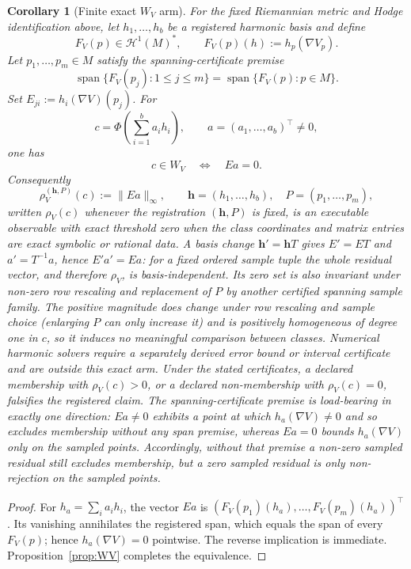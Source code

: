 \documentclass[11pt]{article}
\newtheorem{corollary}[theorem]{Corollary}
\theoremstyle{definition}
\begin{document}
\begin{corollary}[Finite exact \(W_V\) arm]\label{cor:WV-arm}
For the fixed Riemannian metric and Hodge identification above, let
\(h_1,\ldots,h_b\) be a registered harmonic basis and define
\[
F_V(p)\in\mathcal H^1(M)^*,\qquad F_V(p)(h):=h_p(\nabla V_p).
\]
Let \(p_1,\ldots,p_m\in M\) satisfy the spanning-certificate premise
\[
\operatorname{span}\{F_V(p_j):1\le j\le m\}
=\operatorname{span}\{F_V(p):p\in M\}.
\]
Set \(E_{ji}:=h_i(\nabla V)(p_j)\).  For
\[
c=\Phi\!\left(\sum_{i=1}^b a_i h_i\right),
\qquad a=(a_1,\ldots,a_b)^\top\ne0,
\]
one has
\[
c\in W_V\quad\Longleftrightarrow\quad Ea=0.
\]
Consequently
\[
\rho_V^{(\mathbf h,P)}(c):=\lVert Ea\rVert_\infty,
\qquad \mathbf h=(h_1,\ldots,h_b),\quad P=(p_1,\ldots,p_m),
\]
written \(\rho_V(c)\) whenever the registration \((\mathbf h,P)\) is fixed,
is an executable observable with exact threshold zero when the class
coordinates and matrix entries are exact symbolic or rational data.  A
basis change \(\mathbf h'=\mathbf h T\) gives \(E'=ET\) and
\(a'=T^{-1}a\), hence \(E'a'=Ea\): for a fixed ordered sample tuple the
whole residual vector, and therefore \(\rho_V\), is basis-independent.
Its zero set is also invariant under non-zero row rescaling and replacement
of \(P\) by another certified spanning sample family.  The positive
magnitude does change under row rescaling and sample choice (enlarging
\(P\) can only increase it) and is positively homogeneous of degree one in
\(c\), so it induces no meaningful comparison between classes.  Numerical
harmonic solvers require a separately derived error
bound or interval certificate and are outside this exact arm.  Under the
stated certificates, a declared membership with \(\rho_V(c)>0\), or a
declared non-membership with \(\rho_V(c)=0\), falsifies the registered
claim.  The spanning-certificate premise is load-bearing in exactly one
direction: \(Ea\neq0\) exhibits a point at which \(h_a(\nabla V)\neq0\) and
so excludes membership without any span premise, whereas \(Ea=0\) bounds
\(h_a(\nabla V)\) only on the sampled points.  Accordingly, without that
premise a non-zero sampled residual still excludes membership, but a zero
sampled residual is only non-rejection on the sampled points.
\end{corollary}

\begin{proof}
For \(h_a=\sum_i a_i h_i\), the vector \(Ea\) is
\((F_V(p_1)(h_a),\ldots,F_V(p_m)(h_a))^\top\).  Its vanishing annihilates
the registered span, which equals the span of every \(F_V(p)\); hence
\(h_a(\nabla V)=0\) pointwise.  The reverse implication is immediate.
Proposition~\ref{prop:WV} completes the equivalence.
\end{proof}
\end{document}
